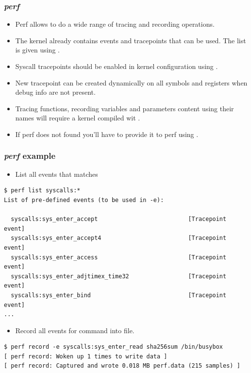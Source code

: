 \begin{frame}
  \frametitle{{\em perf}}
  \begin{itemize}
    \item Perf allows to do a wide range of tracing and recording operations.
    \item The kernel already contains events and tracepoints that can be used.
          The list is given using .
    \item Syscall tracepoints should be enabled in kernel configuration using
          .
    \item New tracepoint can be created dynamically on all symbols and registers
          when debug info are not present.
    \item Tracing functions, recording variables and parameters content using
          their names will require a kernel compiled wit
          .
    \item If perf does not found  you'll have to provide it to
          perf using .
  \end{itemize}
\end{frame}

\begin{frame}[fragile]
  \frametitle{{\em perf} example}
  \begin{itemize}
    \item List all events that matches 
  \end{itemize}
  \begin{block}{}
    \begin{verbatim}
$ perf list syscalls:*
List of pre-defined events (to be used in -e):

  syscalls:sys_enter_accept                          [Tracepoint event]
  syscalls:sys_enter_accept4                         [Tracepoint event]
  syscalls:sys_enter_access                          [Tracepoint event]
  syscalls:sys_enter_adjtimex_time32                 [Tracepoint event]
  syscalls:sys_enter_bind                            [Tracepoint event]
...
    \end{verbatim}
  \end{block}
  \begin{itemize}
    \item Record all  events for 
          command into  file.
  \end{itemize}
  \begin{block}{}
    \begin{verbatim}
$ perf record -e syscalls:sys_enter_read sha256sum /bin/busybox
[ perf record: Woken up 1 times to write data ]
[ perf record: Captured and wrote 0.018 MB perf.data (215 samples) ]
    \end{verbatim}
  \end{block}
\end{frame}

